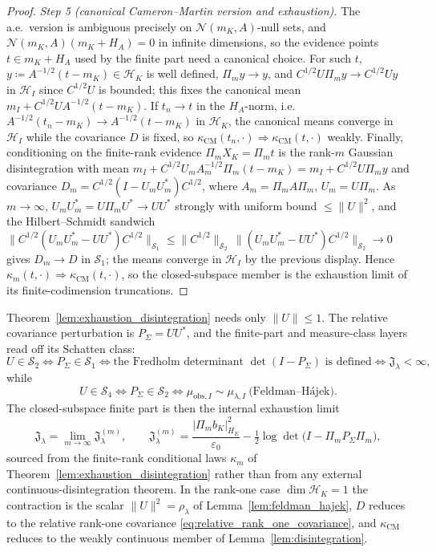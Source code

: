 \begin{proof}
\emph{Step 5 (canonical Cameron--Martin version and exhaustion).}  The a.e.\
version is ambiguous precisely on $\mathcal{N}(m_K,A)$-null sets, and
$\mathcal{N}(m_K,A)(m_K+H_A)=0$ in infinite dimensions, so the evidence points
$t\in m_K+H_A$ used by the finite part need a canonical choice.  For such $t$,
$y\coloneqq A^{-1/2}(t-m_K)\in\mathcal{H}_K$ is well defined, $\Pi_my\to y$, and
$C^{1/2}U\Pi_my\to C^{1/2}Uy$ in $\mathcal{H}_I$ since $C^{1/2}U$ is bounded;
this fixes the canonical mean $m_I+C^{1/2}UA^{-1/2}(t-m_K)$.  If $t_n\to t$ in
the $H_A$-norm, i.e.\ $A^{-1/2}(t_n-m_K)\to A^{-1/2}(t-m_K)$ in $\mathcal{H}_K$,
the canonical means converge in $\mathcal{H}_I$ while the covariance $D$ is
fixed, so $\kappa_{\mathrm{CM}}(t_n,\cdot)\Rightarrow\kappa_{\mathrm{CM}}(t,\cdot)$
weakly.  Finally, conditioning on the finite-rank evidence $\Pi_mX_K=\Pi_mt$ is
the rank-$m$ Gaussian disintegration with mean
$m_I+C^{1/2}U_m A_m^{-1/2}\Pi_m(t-m_K)=m_I+C^{1/2}U\Pi_my$ and covariance
$D_m=C^{1/2}(I-U_mU_m^*)C^{1/2}$, where $A_m=\Pi_mA\Pi_m$, $U_m=U\Pi_m$.  As
$m\to\infty$, $U_mU_m^*=U\Pi_mU^*\to UU^*$ strongly with uniform bound
$\le\|U\|^2$, and the Hilbert--Schmidt sandwich
$\|C^{1/2}(U_mU_m^*-UU^*)C^{1/2}\|_{\mathcal{S}_1}
\le\|C^{1/2}\|_{\mathcal{S}_2}\,\|(U_mU_m^*-UU^*)C^{1/2}\|_{\mathcal{S}_2}\to0$
gives $D_m\to D$ in $\mathcal{S}_1$; the means converge in $\mathcal{H}_I$ by the
previous display.  Hence $\kappa_m(t,\cdot)\Rightarrow\kappa_{\mathrm{CM}}(t,\cdot)$,
so the closed-subspace member is the exhaustion limit of its finite-codimension
truncations.
\end{proof}

\begin{remark}
\label{rem:schatten_thresholds}
Theorem~\ref{lem:exhaustion_disintegration} needs only $\|U\|\le1$.  The relative
covariance perturbation is $P_\Sigma=UU^*$, and the finite-part and measure-class
layers read off its Schatten class:
\[
  U\in\mathcal{S}_2
  \iff P_\Sigma\in\mathcal{S}_1
  \iff \text{the Fredholm determinant }\det(I-P_\Sigma)\text{ is defined}
  \iff \mathfrak{J}_\lambda<\infty,
\]
while
\[
  U\in\mathcal{S}_4
  \iff P_\Sigma\in\mathcal{S}_2
  \iff \mu_{\mathrm{obs},I}\sim\mu_{\lambda,I}\ \text{(Feldman--H\'ajek)} .
\]
The closed-subspace finite part is then the internal exhaustion limit
\[
  \mathfrak{J}_\lambda
  =\lim_{m\to\infty}\mathfrak{J}_\lambda^{(m)},
  \qquad
  \mathfrak{J}_\lambda^{(m)}
  =\frac{|\Pi_mb_K|_{H_E}^2}{\varepsilon_0}
   -\tfrac12\log\det\bigl(I-\Pi_mP_\Sigma\Pi_m\bigr),
\]
sourced from the finite-rank conditional laws $\kappa_m$ of
Theorem~\ref{lem:exhaustion_disintegration} rather than from any external
continuous-disintegration theorem.  In the rank-one case $\dim\mathcal{H}_K=1$
the contraction is the scalar $\|U\|^2=\rho_\lambda$ of
Lemma~\ref{lem:feldman_hajek}, $D$ reduces to the relative rank-one covariance
\eqref{eq:relative_rank_one_covariance}, and $\kappa_{\mathrm{CM}}$ reduces to the
weakly continuous member of Lemma~\ref{lem:disintegration}.
\end{remark}

